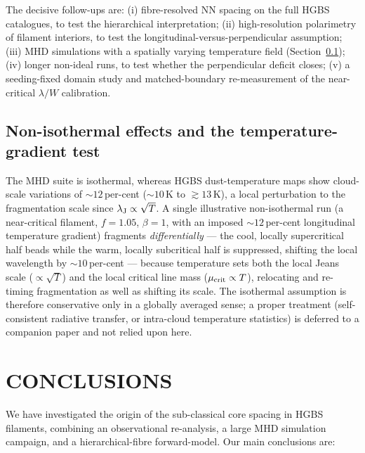 \documentclass[usenatbib,twoside,twocolumn]{mnras}
\begin{document}
The decisive follow-ups are: (i) fibre-resolved NN spacing on the full HGBS catalogues, to test the hierarchical interpretation; (ii) high-resolution polarimetry of filament interiors, to test the longitudinal-versus-perpendicular assumption; (iii) MHD simulations with a spatially varying temperature field (Section~\ref{sec:mt_variation}); (iv) longer non-ideal runs, to test whether the perpendicular deficit closes; (v) a seeding-fixed domain study and matched-boundary re-measurement of the near-critical $\lambda/W$ calibration.


\subsection{Non-isothermal effects and the temperature-gradient test}
\label{sec:mt_variation}

The MHD suite is isothermal, whereas HGBS dust-temperature maps show cloud-scale variations of $\sim12$\,per-cent ($\sim10$\,K to $\gtrsim13$\,K), a local perturbation to the fragmentation scale since $\lambda_{\rm J}\propto\sqrt{T}$. A single illustrative non-isothermal run (a near-critical filament, $f=1.05$, $\beta=1$, with an imposed $\sim12$\,per-cent longitudinal temperature gradient) fragments \emph{differentially} --- the cool, locally supercritical half beads while the warm, locally subcritical half is suppressed, shifting the local wavelength by $\sim10$\,per-cent --- because temperature sets both the local Jeans scale ($\propto\sqrt{T}$) and the local critical line mass ($\mu_{\rm crit}\propto T$), relocating and re-timing fragmentation as well as shifting its scale. The isothermal assumption is therefore conservative only in a globally averaged sense; a proper treatment (self-consistent radiative transfer, or intra-cloud temperature statistics) is deferred to a companion paper and not relied upon here.


\section{CONCLUSIONS}

We have investigated the origin of the sub-classical core spacing in HGBS filaments, combining an observational re-analysis, a large MHD simulation campaign, and a hierarchical-fibre forward-model. Our main conclusions are:
\end{document}
